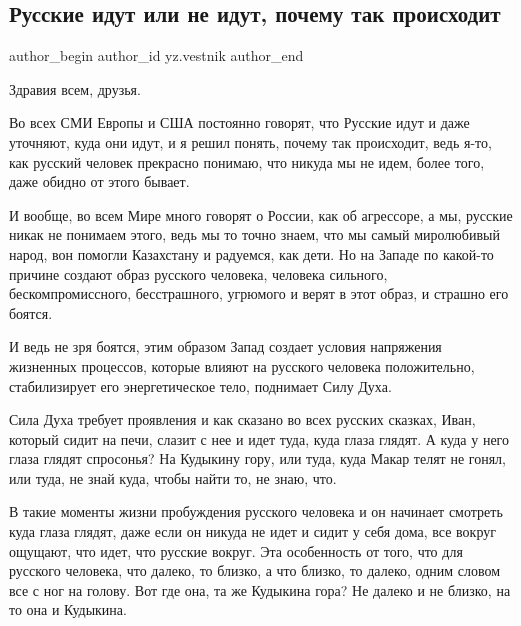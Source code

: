  
 
 
 
 
\subsection{Русские идут или не идут, почему так происходит}
\label{sec:11_01_2022.yz.vestnik.1.russkie_idut}

\ifcmt
 author_begin
   author_id yz.vestnik
 author_end
\fi

Здравия всем, друзья.

Во всех СМИ Европы и США постоянно говорят, что Русские идут и даже уточняют,
куда они идут, и я решил понять, почему так происходит, ведь я-то, как русский
человек прекрасно понимаю, что никуда мы не идем, более того, даже обидно от
этого бывает.

И вообще, во всем Мире много говорят о России, как об агрессоре, а мы, русские
никак не понимаем этого, ведь мы то точно знаем, что мы самый миролюбивый
народ, вон помогли Казахстану и радуемся, как дети. Но на Западе по какой-то
причине создают образ русского человека, человека сильного, бескомпромиссного,
бесстрашного, угрюмого и верят в этот образ, и страшно его боятся.

И ведь не зря боятся, этим образом Запад создает условия напряжения жизненных
процессов, которые влияют на русского человека положительно, стабилизирует его
энергетическое тело, поднимает Силу Духа.

\begin{zznagolos}
Сила Духа требует проявления и как сказано во всех русских сказках, Иван,
который сидит на печи, слазит с нее и идет туда, куда глаза глядят. А куда у
него глаза глядят спросонья? На Кудыкину гору, или туда, куда Макар телят не
гонял, или туда, не знай куда, чтобы найти то, не знаю, что.	
\end{zznagolos}

В такие моменты жизни пробуждения русского человека и он начинает смотреть куда
глаза глядят, даже если он никуда не идет и сидит у себя дома, все вокруг
ощущают, что идет, что русские вокруг. Эта особенность от того, что для
русского человека, что далеко, то близко, а что близко, то далеко, одним словом
все с ног на голову. Вот где она, та же Кудыкина гора? Не далеко и не близко,
на то она и Кудыкина.

